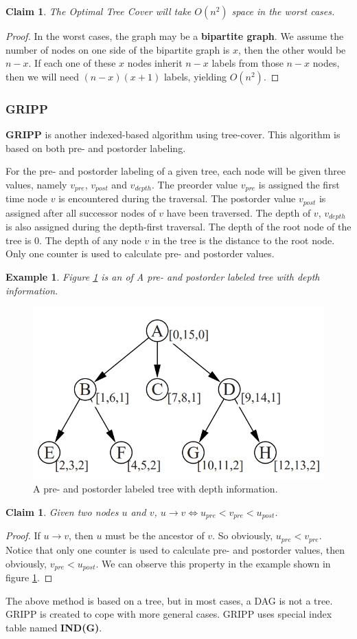 \documentclass[11pt]{article}
\newtheorem{example}[theorem]{Example}
\newtheorem{claim}[theorem]{Claim}
\begin{document}
\begin{enumerate}
	\begin{claim}
		The Optimal Tree Cover will take $O(n^2)$ space in the worst cases.
	\end{claim}
	\begin{proof}
		In the worst cases, the graph may be a \textbf{bipartite graph}. We assume the number of nodes on one side of the bipartite graph is $x$, then the other would be $n-x$. If each one of these $x$ nodes inherit $n-x$ labels from those $n-x$ nodes, then we will need $(n-x)(x+1)$ labels, yielding $O(n^2)$.
	\end{proof}	
\end{enumerate}

\subsubsection{GRIPP}
\textbf{GRIPP}\cite{ref3} is another indexed-based algorithm using tree-cover. This algorithm is based on both pre- and postorder labeling.

For the pre- and postorder labeling of a given tree, each node will be given three values, namely $v_{pre}$, $v_{post}$ and $v_{depth}$. The preorder value $v_{pre}$ is assigned the first time node $v$ is encountered during the traversal. The postorder value $v_{post}$ is assigned after all successor nodes of $v$ have been traversed. The depth of $v$, $v_{depth}$ is also assigned during the depth-first traversal. The depth of the root node of the tree is 0. The depth of any node $v$ in the tree is the distance to the root node. Only one counter is used to calculate pre- and postorder values.
\begin{example}
	Figure \ref{fig:gripplabeling1} is an of A pre- and postorder labeled tree with depth information.
\end{example}
\begin{figure}[H]
	\centering
	\includegraphics[width=0.4\linewidth]{gripplabeling1}
	\caption{A pre- and postorder labeled tree with depth information.}
	\label{fig:gripplabeling1}
\end{figure}
\begin{claim}
	Given two nodes $u$ and $v$, $u\rightarrow v \Leftrightarrow u_{pre} < v_{pre} < u_{post}$.
\end{claim}
\begin{proof}
	If $u\rightarrow v$, then $u$ must be the ancestor of $v$. So obviously, $u_{pre} < v_{pre}$. Notice that only one counter is used to calculate pre- and postorder values, then obviously, $v_{pre} < u_{post}$. We can observe this property in the example shown in figure \ref{fig:gripplabeling1}.
\end{proof}
The above method is based on a tree, but in most cases, a DAG is not a tree. GRIPP is created to cope with more general cases. GRIPP uses special index table named \textbf{IND(G)}.
\end{document}
